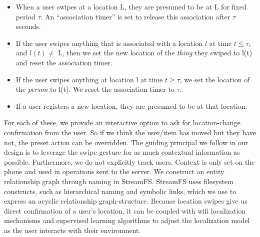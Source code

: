 \begin{itemize}
\item When a user swipes at a location L, they are presumed to be at L for fixed period $\tau$.  An ``association timer'' is set to 
        release this association after $\tau$ seconds.
\item If the user swipes anything that is associated with a location $l$ at time $t \le \tau$, and $l(t)\ne$ L, 
        then we set the new location of the \emph{thing} they swiped to l(t) and reset the association timer.
\item If the user swipes anything at location l at time $t \ge \tau$, we set the location of the \emph{person} to l(t).
        We reset the association timer to $\tau$.
\item If a user registers a new location, they are presumed to be at that location.
\end{itemize}
\vspace{0.08in}


For each of these, we provide an interactive option to ask for location-change confirmation from the user.  So if we think the
user/item has moved but they have not, the preset action can be overridden.  The guiding principal we follow in our design
is to leverage the swipe gesture for as much contextual information as possible.  Furthermore, we do not explicitly track users.
Context is only set on the phone and used in operations sent to the server.  
We construct an entity relationship graph through 
naming in StreamFS.  StreamFS uses filesystem constructs, such as hierarchical naming and symbolic
links, which we use to express an acyclic relationship graph-structure.
Because location swipes give us direct confirmation of a user's location, it can be coupled with wifi localization mechanisms
and supervised learning algorithms to adjust the localization model as the user interacts with their environment. 

